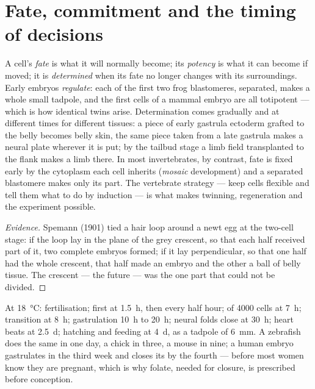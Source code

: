 \section{Fate, commitment and the timing of decisions}

\begin{proposition}\label{prop:b2:vertebrate-development:commitment}
A cell's \emph{fate} is what it will normally become; its
\emph{potency} is what it can become if moved; it is
\emph{determined} when its fate no longer changes with its
surroundings. Early embryos \emph{regulate}: each of the first two
frog blastomeres, separated, makes a whole small tadpole, and the
first cells of a mammal embryo are all totipotent --- which is how
identical twins arise. Determination comes gradually and at
different times for different tissues: a piece of early gastrula
ectoderm grafted to the belly becomes belly skin, the same piece
taken from a late gastrula makes a neural plate wherever it is put;
by the tailbud stage a limb field transplanted to the flank makes a
limb there. In most invertebrates, by contrast, fate is fixed early
by the cytoplasm each cell inherits (\emph{mosaic} development) and
a separated blastomere makes only its part. The vertebrate strategy
--- keep cells flexible and tell them what to do by induction ---
is what makes twinning, regeneration and the  experiment
possible.
\end{proposition}
\begin{proof}[Evidence]
Spemann (1901) tied a hair loop around a newt egg at the two-cell
stage: if the loop lay in the plane of the grey crescent, so that
each half received part of it, two complete embryos formed; if it
lay perpendicular, so that one half had the whole crescent, that
half made an embryo and the other a ball of belly tissue. The
crescent --- the future  --- was the one part that could
not be divided.
\end{proof}

\begin{example}\label{ex:b2:vertebrate-development:timetable}
At \qty{18}{\celsius}: fertilisation; first  at \qty{1.5}{h},
then every half hour;  of \num{4000} cells at \qty{7}{h};
 transition at \qty{8}{h}; gastrulation \qty{10}{h} to
\qty{20}{h}; neural folds close at \qty{30}{h}; heart beats at
\qty{2.5}{d}; hatching and feeding at \qty{4}{d}, as a tadpole of
\qty{6}{mm}. A zebrafish does the same in one day, a chick in three,
a mouse in nine; a human embryo gastrulates in the third week and
closes its  by the fourth --- before most women know they
are pregnant, which is why folate, needed for  closure,
is prescribed before conception.
\end{example}

